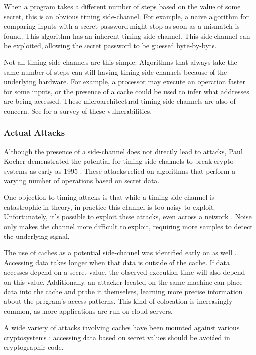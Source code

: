 \documentclass[11pt, a4paper]{article} %
\begin{document}
{When a program takes a different number of steps based on the value of some
secret, this is an obvious timing side-channel.
For example, a naive algorithm for comparing inputs with a secret password
might stop as soon as a mismatch is found. This algorithm has
an inherent timing side-channel. This side-channel can be exploited,
allowing the secret password to be guessed byte-by-byte.

Not all timing side-channels are this simple. Algorithms
that always take the same number of steps
can still having timing side-channels because of the underlying
hardware. For example, a processor may
execute an operation faster for some inputs, or the presence of a cache
could be used to infer what addresses are being accessed. These
microarchitectural timing side-channels are also of concern.
See \cite{ge_survey_2018} for a survey of these vulnerabilities.

\subsubsection{Actual Attacks}

Although the presence of a side-channel
does not directly lead to attacks,
Paul Kocher
demonstrated the potential for timing side-channels to break
crypto-systems as early as 1995
\cite{kocher_cryptanalysis_1995, kocher_timing_1996}.
These attacks relied on algorithms that perform a varying number of
operations based on secret data. 

One objection to timing attacks is that
while a timing side-channel is catastrophic in theory, in practice
this channel is too noisy to exploit. Unfortunately,
it's possible to exploit these attacks, even across
a network \cite{brumley_remote_2005, brumley_remote_2011}.
Noise only makes the channel more difficult to exploit,
requiring more samples to detect the underlying signal.

The use of caches as a potential side-channel was
identified early on as well \cite{page_theoretical_2002}.
Accessing data takes longer when that data is outside
of the cache.
If data accesses depend on a secret value, the observed execution
time will also depend on this value. Additionally,
an attacker located on the same machine
can place data into the cache and probe it themselves,
learning more precise information about the
program's access patterns. This kind of colocation is increasingly common,
as more applications are run on cloud servers.

A wide variety of attacks involving caches have been mounted
against various cryptosystems
\cite{
  bernstein_cache-timing_2005,
  yarom_cachebleed_2017,
  cabrera_aldaya_cache-timing_2019}
: accessing data based on secret values should
be avoided in cryptographic code.

}
\end{document}
